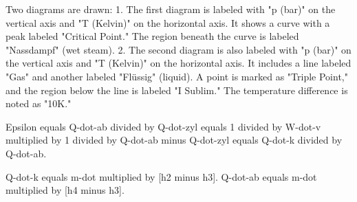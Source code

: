 Two diagrams are drawn:  
1. The first diagram is labeled with "p (bar)" on the vertical axis and "T (Kelvin)" on the horizontal axis. It shows a curve with a peak labeled "Critical Point." The region beneath the curve is labeled "Nassdampf" (wet steam).  
2. The second diagram is also labeled with "p (bar)" on the vertical axis and "T (Kelvin)" on the horizontal axis. It includes a line labeled "Gas" and another labeled "Flüssig" (liquid). A point is marked as "Triple Point," and the region below the line is labeled "I Sublim." The temperature difference is noted as "10K."

Epsilon equals Q-dot-ab divided by Q-dot-zyl equals 1 divided by W-dot-v multiplied by 1 divided by Q-dot-ab minus Q-dot-zyl equals Q-dot-k divided by Q-dot-ab.  

Q-dot-k equals m-dot multiplied by [h2 minus h3].  
Q-dot-ab equals m-dot multiplied by [h4 minus h3].